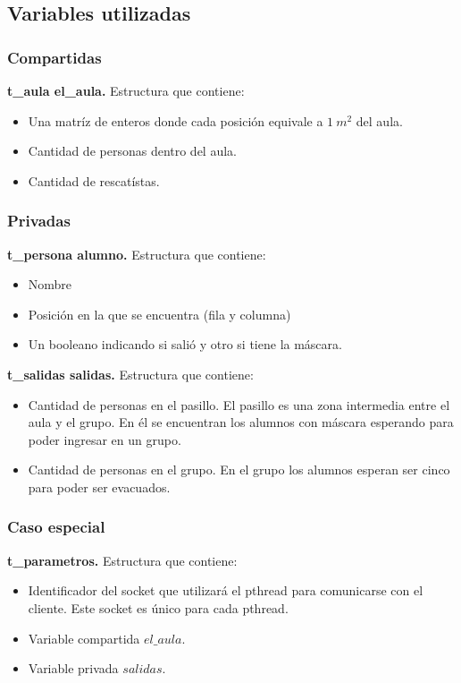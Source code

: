 \subsection{Variables utilizadas}
\subsubsection{Compartidas}
\textbf{t\_aula el\_aula.}
Estructura que contiene: 
\begin{itemize}
 \item Una matríz de enteros donde cada posición equivale a $1\ m^{2}$ del aula.
 \item Cantidad de personas dentro del aula.
 \item Cantidad de rescatístas.
\end{itemize}

\subsubsection{Privadas}
\textbf{t\_persona alumno.}
Estructura que contiene: 
\begin{itemize}
 \item Nombre
 \item Posición en la que se encuentra (fila y columna)
 \item Un booleano indicando si salió y otro si tiene la máscara.
\end{itemize}

\smallskip
\textbf{t\_salidas salidas.}
Estructura que contiene: 
\begin{itemize}
 \item Cantidad de personas en el pasillo. 
 El pasillo es una zona intermedia entre el aula y el grupo. En él se encuentran 
 los alumnos con máscara esperando para poder ingresar en un grupo.
 \item Cantidad de personas en el grupo. 
 En el grupo los alumnos esperan ser cinco para poder ser evacuados.
\end{itemize}

\subsubsection{Caso especial}
\textbf{t\_parametros.} 
Estructura que contiene: 
\begin{itemize}
 \item Identificador del socket que utilizará el pthread para comunicarse con el cliente.
 Este socket es único para cada pthread.
 \item Variable compartida $el\_ aula$.
 \item Variable privada $salidas$.
\end{itemize}

